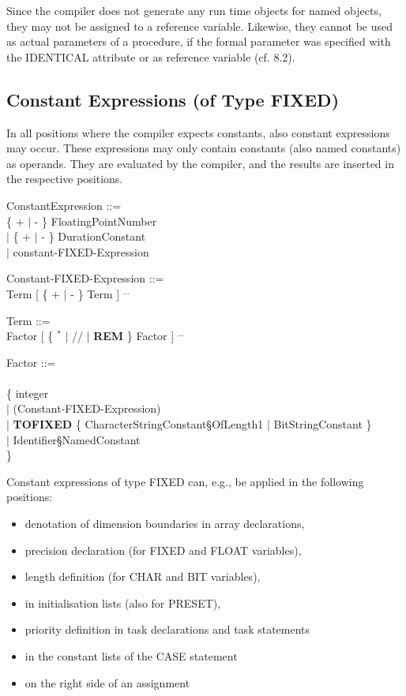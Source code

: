 \begin{tobedone}
Since the compiler does not generate any run time objects for named
objects, they may not be assigned to a reference variable. Likewise,
they cannot be used as actual parameters of a procedure, if the formal
parameter was specified with the IDENTICAL attribute or as reference
variable (cf. 8.2).

\subsection{Constant Expressions (of Type FIXED)}   %

In all positions where the compiler expects constants, also constant
expressions may occur. These expressions may only contain constants
(also named constants) as operands. They are evaluated by the compiler,
and the results are inserted in the respective positions.

ConstantExpression ::=\\
\x \{ + $\mid$ - \} FloatingPointNumber\\
\x $\mid$ \{ + $\mid$ - \} DurationConstant\\
\x $\mid$ constant-FIXED-Expression

Constant-FIXED-Expression ::=\\
\x Term [ \{ + $\mid$ - \} Term ] $^{...}$

Term ::=\\
\x Factor [ \{ $^*$ $\mid$ // $\mid$ {\bf REM} \} Factor ] $^{...}$

Factor ::=\\
\x [ + $\mid$ - ] \\
\x \{ integer \\
\x \x $\mid$ (Constant-FIXED-Expression)\\
\x \x $\mid$ {\bf TOFIXED} \{ CharacterStringConstant\S OfLength1 $\mid$ BitStringConstant \}\\
\x \x $\mid$ Identifier\S NamedConstant\\
\x \} \\

Constant expressions of type FIXED can, e.g., be applied in the
following positions:
\begin{itemize}
\item denotation of dimension boundaries in array declarations,
\item precision declaration (for FIXED and FLOAT variables),
\item length definition (for CHAR and BIT variables),
\item in initialisation lists (also for PRESET),
\item priority definition in task declarations and task statements
\item in the constant lists of the CASE statement
\item on the right side of an assignment
\end{itemize}


\end{tobedone}
